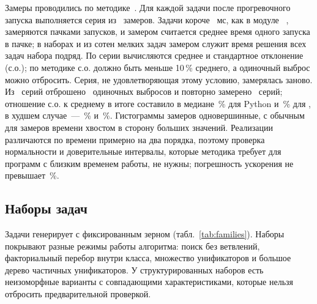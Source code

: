 Замеры проводились по методике~\cite{SmirnovCheatsheet}.
Для каждой задачи после прогревочного запуска выполняется серия из \NRepeat{}~замеров.
Задачи короче \MinSampleMs~мс, как в модуле ~\cite{PythonTimeit}, замеряются пачками запусков, и замером считается среднее время одного запуска в пачке; в наборах  и  из сотен мелких задач замером служит время решения всех задач набора подряд.
По серии вычисляются среднее и стандартное отклонение (с.о.); по методике с.о. должно быть меньше 10\,\% среднего, а одиночный выброс можно отбросить.
Серия, не удовлетворяющая этому условию, замерялась заново.
Из \NSeries{}~серий отброшено \NDropped{}~одиночных выбросов и повторно замерено \NRetried{}~серий; отношение с.о. к среднему в итоге составило в медиане \CvPyMedian\,\% для Python и \CvCppMedian\,\% для \Cpp{}, в худшем случае~--- \CvPyMax\,\% и \CvCppMax\,\%.
Гистограммы замеров одновершинные, с обычным для замеров времени хвостом в сторону больших значений.
Реализации различаются по времени примерно на два порядка, поэтому проверка нормальности и доверительные интервалы, которые методика требует для программ с близким временем работы, не нужны; погрешность ускорения не превышает \SpeedupErrMax\,\%.

\subsection{Наборы задач}
\label{subsec:families}

Задачи генерирует  с фиксированным зерном (табл.~\ref{tab:families}).
Наборы покрывают разные режимы работы алгоритма: поиск без ветвлений, факториальный перебор внутри класса, множество унификаторов и большое дерево частичных унификаторов.
У структурированных наборов есть неизоморфные варианты с совпадающими характеристиками, которые нельзя отбросить предварительной проверкой.

